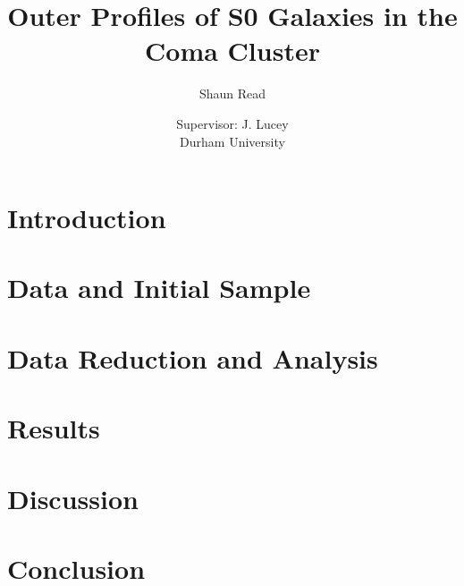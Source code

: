 \documentclass[12pt, preprint]{aastex}
\begin{document}
\title{Outer Profiles of S0 Galaxies in the Coma Cluster}
\author{Shaun Read}
\author{Supervisor: J. Lucey\\ Durham University}


\begin{abstract}
	
\end{abstract}
\maketitle
\tableofcontents

\section{Introduction}
	
\section{Data and Initial Sample}
	
\section{Data Reduction and Analysis}
	
\section{Results}
	
\section{Discussion}
	
\section{Conclusion}
	


\end{document}
